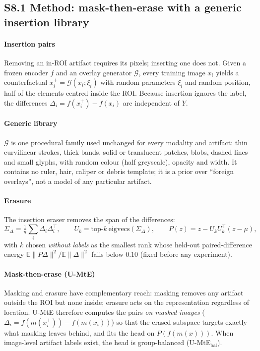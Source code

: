 \subsection*{S8.1 Method: mask-then-erase with a generic insertion library}
\paragraph{Insertion pairs} Removing an in-ROI artifact requires its pixels; inserting one does not. Given a
frozen encoder $f$ and an overlay generator $\mathcal{G}$, every training image $x_i$ yields a counterfactual
$x_i^{+}=\mathcal{G}(x_i;\xi_i)$ with random parameters $\xi_i$ and random position, half of the elements centred
inside the ROI. Because insertion ignores the label, the differences $\Delta_i=f(x_i^{+})-f(x_i)$ are independent
of $Y$.
\paragraph{Generic library} $\mathcal{G}$ is one procedural family used unchanged for every modality and
artifact: thin curvilinear strokes, thick bands, solid or translucent patches, blobs, dashed lines and small
glyphs, with random colour (half greyscale), opacity and width. It contains no ruler, hair, caliper or debris
template; it is a prior over ``foreign overlays'', not a model of any particular artifact.
\paragraph{Erasure} The insertion eraser removes the span of the differences:
\begin{equation}
\Sigma_\Delta=\tfrac1n\textstyle\sum_i\Delta_i\Delta_i^\top,\qquad U_k=\mathrm{top}\text{-}k\ \mathrm{eigvecs}(\Sigma_\Delta),\qquad
P(z)=z-U_kU_k^\top(z-\mu),
\end{equation}
with $k$ chosen \emph{without labels} as the smallest rank whose held-out paired-difference energy
$\mathbb{E}\|P\Delta\|^2/\mathbb{E}\|\Delta\|^2$ falls below $0.10$ (fixed before any experiment).
\paragraph{Mask-then-erase (U-MtE)} Masking and erasure have complementary reach: masking removes any artifact
outside the ROI but none inside; erasure acts on the representation regardless of location. U-MtE therefore
computes the pairs \emph{on masked images} ($\Delta_i=f(m(x_i^{+}))-f(m(x_i))$) so that the erased subspace
targets exactly what masking leaves behind, and fits the head on $P(f(m(x)))$. When image-level artifact labels
exist, the head is group-balanced (U-MtE$_{\text{bal}}$).
